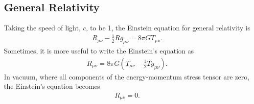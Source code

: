 \documentclass{book}
\numberwithin{equation}{section}
\theoremstyle{definition}
\begin{document}
\subsection{General Relativity}

Taking the speed of light, $c$, to be 1, the Einstein equation for general relativity is
\begin{align}
R_{\mu\nu} - \frac{1}{2}Rg_{\mu\nu} = 8\pi GT_{\mu\nu}.
\end{align}
Sometimes, it is more useful to write the Einstein's equation as
\begin{align}
R_{\mu\nu} = 8\pi G \left( T_{\mu\nu} - \frac{1}{2}Tg_{\mu\nu} \right).
\end{align}
In vacuum, where all components of the energy-momentum stress tensor are zero, the Einstein's equation becomes
\begin{align}
R_{\mu\nu} = 0.
\end{align}
\end{document}
